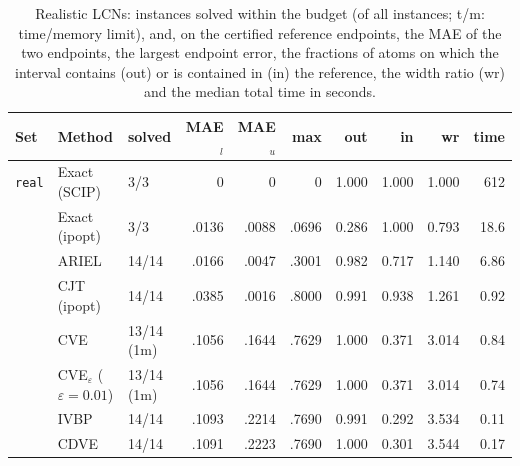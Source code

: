 \begin{table}[htbp]
\centering
\scriptsize
\revcaption\caption{Realistic LCNs: instances solved within the budget (of all instances; t/m: time/memory limit), and, on the certified reference endpoints, the MAE of the two endpoints, the largest endpoint error, the fractions of atoms on which the interval contains (out) or is contained in (in) the reference, the width ratio (wr) and the median total time in seconds.}
\label{tab:real-summary}
\begin{tabular}{ll lrrrrrrr}
\toprule
Set & Method & solved & MAE$_l$ & MAE$_u$ & max & out & in & wr & time \\
\midrule
\texttt{real} & Exact (SCIP) & 3/3 & 0 & 0 & 0 & 1.000 & 1.000 & 1.000 & 612 \\
 & Exact (ipopt) & 3/3 & .0136 & .0088 & .0696 & 0.286 & 1.000 & 0.793 & 18.6 \\
 & ARIEL & 14/14 & .0166 & .0047 & .3001 & 0.982 & 0.717 & 1.140 & 6.86 \\
 & CJT (ipopt) & 14/14 & .0385 & .0016 & .8000 & 0.991 & 0.938 & 1.261 & 0.92 \\
 & CVE & 13/14 (1m) & .1056 & .1644 & .7629 & 1.000 & 0.371 & 3.014 & 0.84 \\
 & CVE$_\varepsilon$ ($\varepsilon{=}0.01$) & 13/14 (1m) & .1056 & .1644 & .7629 & 1.000 & 0.371 & 3.014 & 0.74 \\
 & IVBP & 14/14 & .1093 & .2214 & .7690 & 0.991 & 0.292 & 3.534 & 0.11 \\
 & CDVE & 14/14 & .1091 & .2223 & .7690 & 1.000 & 0.301 & 3.544 & 0.17 \\
\bottomrule
\end{tabular}
\end{table}
